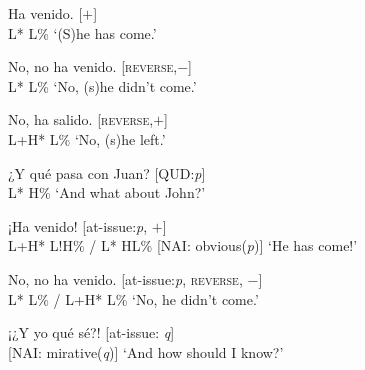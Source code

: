 \begin{exe}
	\ex \label{ex:havenidoDECL}
	\begin{xlist}[A:]
	 Ha venido. \hfill [$+$]\\
	\hspace*{3em} L* L\% 
	\glt `(S)he has come.' 
	\end{xlist}
\begin{xlist}
	\ex 
	\begin{xlist}[A:]
	 No, no ha venido. \hfill [\textsc{reverse},$-$]\\
	\hspace*{5.5em} L* L\% 
	\glt `No, (s)he didn't come.' 
	\end{xlist}
	
	\ex 
	\begin{xlist}[A:]
	 No, ha salido. \hfill [\textsc{reverse},$+$]\\
	\hspace*{2.5em} L+H* L\% 
	\glt `No, (s)he left.'
	\end{xlist}
\end{xlist}

\ex \label{ex:havenidoOBV} 
	\begin{xlist}
		\ex 
		\begin{xlist}[A:]
		 ¿Y qué pasa con Juan? \hfill [QUD:\textit{p}] \\
		\hspace*{6.5em} L* H\% 
		\glt `And what about John?'
		\end{xlist}
		\ex 
		\begin{xlist}[A:]
		 ¡Ha venido! \hfill [at-issue:\textit{p}, $+$] \\
		\hspace*{1em} L+H* L!H\% / L* HL\% \hfill [\ac{NAI}: obvious(\textit{p})] 
		\glt `He has come!'
		\end{xlist}

		\ex
		\begin{xlist}
		\ex 
		\begin{xlist}[A:]
		 No, no ha venido. \hfill [at-issue:\textit{p}, \textsc{reverse}, $-$]\\
		\hspace*{5em} L* L\% / L+H* L\%
		\glt `No, he didn't come.' 
		\end{xlist}
		
		\ex 
		\begin{xlist}[A:]
		 ¡¿Y yo qué sé?! \hfill [at-issue: \textit{q}] \\
		\hspace*{6em}  \hfill [\ac{NAI}: mirative(\textit{q})] 
		\glt `And how should I know?' 
		\end{xlist}
		\end{xlist}
	\end{xlist}
\end{exe}

